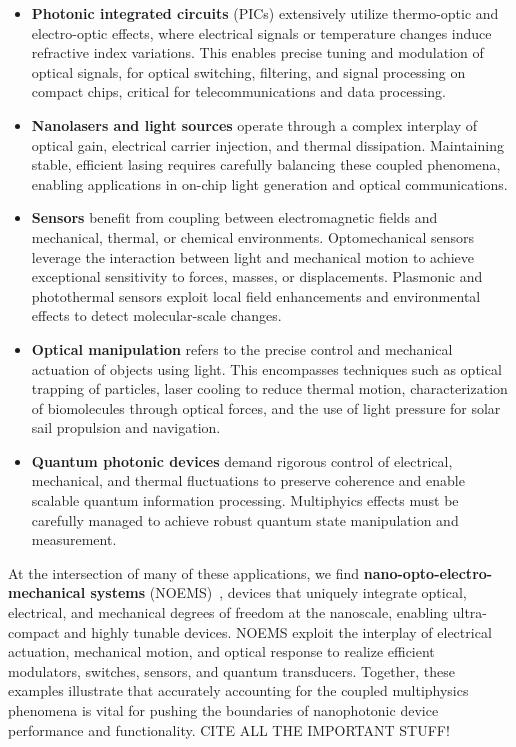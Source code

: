 \begin{itemize}

\item \textbf{Photonic integrated circuits} (PICs) extensively utilize thermo-optic and electro-optic effects, where electrical signals or temperature changes induce refractive index variations. This enables precise tuning and modulation of optical signals, for optical switching, filtering, and signal processing on compact chips, critical for telecommunications and data processing.

\item \textbf{Nanolasers and light sources} operate through a complex interplay of optical gain, electrical carrier injection, and thermal dissipation. Maintaining stable, efficient lasing requires carefully balancing these coupled phenomena, enabling applications in on-chip light generation and optical communications.

\item \textbf{Sensors} benefit from coupling between electromagnetic fields and mechanical, thermal, or chemical environments. Optomechanical sensors leverage the interaction between light and mechanical motion to achieve exceptional sensitivity to forces, masses, or displacements. Plasmonic and photothermal sensors exploit local field enhancements and environmental effects to detect molecular-scale changes.

\item \textbf{Optical manipulation} refers to the precise control and mechanical actuation of objects using light. This encompasses techniques such as optical trapping of particles, laser cooling to reduce thermal motion, characterization of biomolecules through optical forces, and the use of light pressure for solar sail propulsion and navigation.

\item \textbf{Quantum photonic devices} demand rigorous control of electrical, mechanical, and thermal fluctuations to preserve coherence and enable scalable quantum information processing. Multiphyics effects must be carefully managed to achieve robust quantum state manipulation and measurement.

\end{itemize}

At the intersection of many of these applications, we find \textbf{nano-opto-electro-mechanical systems} (NOEMS)~\cite{NOEMS}, devices that uniquely integrate optical, electrical, and mechanical degrees of freedom at the nanoscale, enabling ultra-compact and highly tunable devices. 
NOEMS exploit the interplay of electrical actuation, mechanical motion, and optical response to realize efficient modulators, switches, sensors, and quantum transducers. 
Together, these examples illustrate that accurately accounting for the coupled multiphysics phenomena is vital for pushing the boundaries of nanophotonic device performance and functionality. CITE ALL THE IMPORTANT STUFF!

